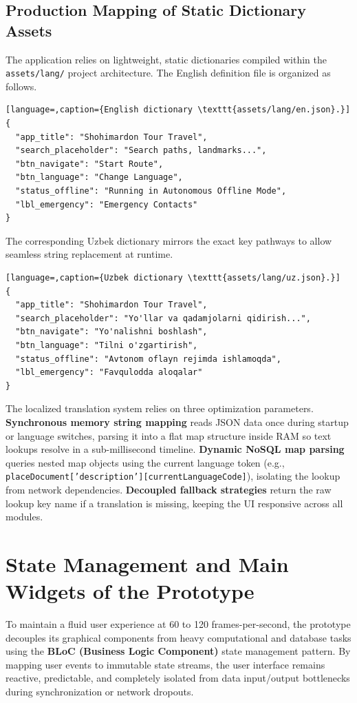 \documentclass[12pt,a4paper,oneside]{report}
\begin{document}
\subsection{Production Mapping of Static Dictionary Assets}

The application relies on lightweight, static dictionaries compiled within the
\texttt{assets/lang/} project architecture. The English definition file is organized as
follows.

\begin{lstlisting}[language=,caption={English dictionary \texttt{assets/lang/en.json}.}]
{
  "app_title": "Shohimardon Tour Travel",
  "search_placeholder": "Search paths, landmarks...",
  "btn_navigate": "Start Route",
  "btn_language": "Change Language",
  "status_offline": "Running in Autonomous Offline Mode",
  "lbl_emergency": "Emergency Contacts"
}
\end{lstlisting}

The corresponding Uzbek dictionary mirrors the exact key pathways to allow seamless string
replacement at runtime.

\begin{lstlisting}[language=,caption={Uzbek dictionary \texttt{assets/lang/uz.json}.}]
{
  "app_title": "Shohimardon Tour Travel",
  "search_placeholder": "Yo'llar va qadamjolarni qidirish...",
  "btn_navigate": "Yo'nalishni boshlash",
  "btn_language": "Tilni o'zgartirish",
  "status_offline": "Avtonom oflayn rejimda ishlamoqda",
  "lbl_emergency": "Favqulodda aloqalar"
}
\end{lstlisting}

The localized translation system relies on three optimization parameters.
\textbf{Synchronous memory string mapping} reads JSON data once during startup or language
switches, parsing it into a flat map structure inside RAM so text lookups resolve in a
sub-millisecond timeline. \textbf{Dynamic NoSQL map parsing} queries nested map objects
using the current language token (e.g.,
\texttt{placeDocument['description'][currentLanguageCode]}), isolating the lookup from
network dependencies. \textbf{Decoupled fallback strategies} return the raw lookup key name
if a translation is missing, keeping the UI responsive across all modules.

\section{State Management and Main Widgets of the Prototype}

To maintain a fluid user experience at 60 to 120 frames-per-second, the prototype decouples
its graphical components from heavy computational and database tasks using the
\textbf{BLoC (Business Logic Component)} state management pattern. By mapping user events to
immutable state streams, the user interface remains reactive, predictable, and completely
isolated from data input/output bottlenecks during synchronization or network dropouts.
\end{document}
